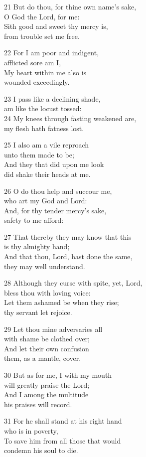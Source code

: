 21 But do thou, for thine own name’s sake,\\
O God the Lord, for me:\\
Sith good and sweet thy mercy is,\\
from trouble set me free.

22 For I am poor and indigent,\\
afflicted sore am I,\\
My heart within me also is\\
wounded exceedingly.

23 I pass like a declining shade,\\
am like the locust tossed:\\
24 My knees through fasting weakened are,\\
my flesh hath fatness lost.

25 I also am a vile reproach\\
unto them made to be;\\
And they that did upon me look\\
did shake their heads at me.

26 O do thou help and succour me,\\
who art my God and Lord:\\
And, for thy tender mercy’s sake,\\
safety to me afford:

27 That thereby they may know that this\\
is thy almighty hand;\\
And that thou, Lord, hast done the same,\\
they may well understand.

28 Although they curse with spite, yet, Lord,\\
bless thou with loving voice:\\
Let them ashamed be when they rise;\\
thy servant let rejoice.

29 Let thou mine adversaries all\\
with shame be clothed over;\\
And let their own confusion\\
them, as a mantle, cover.

30 But as for me, I with my mouth\\
will greatly praise the Lord;\\
And I among the multitude\\
his praises will record.

31 For he shall stand at his right hand\\
who is in poverty,\\
To save him from all those that would\\
condemn his soul to die.

